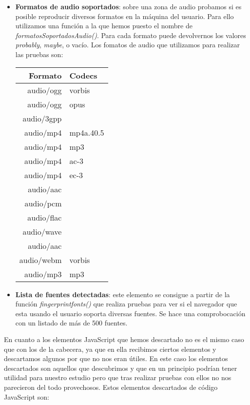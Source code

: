 \begin{itemize}
\begin{table}[htbp]
    \end{table}
    \item \textbf{Formatos de audio soportados}: sobre una zona de audio probamos si es posible reproducir diversos formatos en la máquina del usuario. Para ello utilizamos una función a la que hemos puesto el nombre de \textit{formatosSoportadosAudio()}. Para cada formato puede devolvernos los valores \textit{probably}, \textit{maybe}, o vacío. Los fomatos de audio que utilizamos para realizar las pruebas son:
    \begin{table}[htbp]
        \begin{center}
            \begin{tabular}{ r | l }
            \textbf{Formato} & \textbf{Codecs} \\ \hline
            audio/ogg & vorbis \\
            audio/ogg & opus \\
            audio/3gpp \\
            audio/mp4 & mp4a.40.5 \\
            audio/mp4 & mp3 \\
            audio/mp4 & ac-3 \\
            audio/mp4 & ec-3 \\
            audio/aac \\
            audio/pcm \\
            audio/flac \\
            audio/wave \\
            audio/aac \\
            audio/webm & vorbis \\
            audio/mp3 & mp3 \\
            \end{tabular}
        \end{center}
    \end{table}
    \item \textbf{Lista de fuentes detectadas}: este elemento se consigue a partir de la función \textit{fingerprintfonts()} que realiza pruebas para ver si el navegador que esta usando el usuario soporta diversas fuentes. Se hace una comprobocación con un listado de más de 500 fuentes.
\end{itemize}
En cuanto a los elementos JavaScript que hemos descartado no es el mismo caso que con los de la cabecera, ya que en ella recibimos ciertos elementos y descartamos algunos por que no nos eran útiles. En este caso los elementos descartados son aquellos que descubrimos y que en un principio podrían tener utilidad para nuestro estudio pero que tras realizar pruebas con ellos no nos parecieron del todo provechosos. Estos elementos descartados de código JavaScript son:

